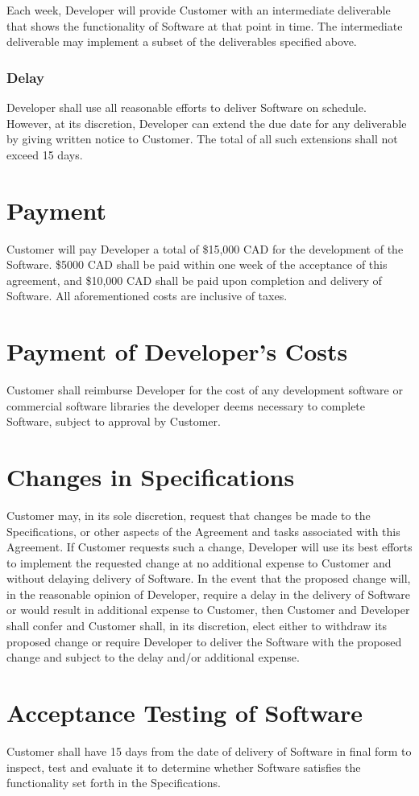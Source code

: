 \documentclass[11pt]{article}
\begin{document}
Each week, Developer will provide Customer with an intermediate deliverable that shows the functionality of Software at that point in time. The intermediate deliverable may implement a subset of the deliverables specified above. 
\subsubsection{Delay}
Developer shall use all reasonable efforts to deliver Software on schedule. However, at its discretion, Developer can extend the due date for any deliverable by giving written notice to Customer. The total of all such extensions shall not exceed 15 days. 
\section{Payment}	
Customer will pay Developer a total of \$15,000 CAD for the development of the Software. \$5000 CAD shall be paid within one week of the acceptance of this agreement, and \$10,000 CAD shall be paid upon completion and delivery of Software. All aforementioned costs are inclusive of taxes.
\section{Payment of Developer's Costs}
Customer shall reimburse Developer for the cost of any development software or commercial software libraries the developer deems necessary to complete Software, subject to approval by Customer.
\section{Changes in Specifications}
Customer may, in its sole discretion, request that changes be made to the Specifications, or other aspects of the Agreement and tasks associated with this Agreement. If Customer requests such a change, Developer will use its best efforts to implement the requested change at no additional expense to Customer and without delaying delivery of Software. In the event that the proposed change will, in the reasonable opinion of Developer, require a delay in the delivery of Software or would result in additional expense to Customer, then Customer and Developer shall confer and Customer shall, in its discretion, elect either to withdraw its proposed change or require Developer to deliver the Software with the proposed change and subject to the delay and/or additional expense.
\section{Acceptance Testing of Software}
Customer shall have 15 days from the date of delivery of Software in final form to inspect, test and evaluate it to determine whether Software satisfies the functionality set forth in the Specifications.
\end{document}
